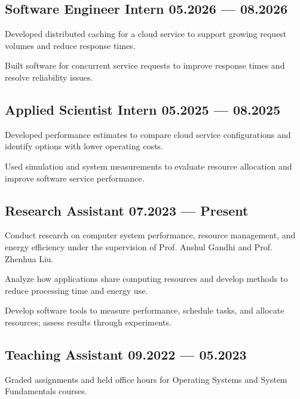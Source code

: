 \subsection{{Software Engineer Intern \hfill 05.2026 --- 08.2026}}
\begin{zitemize}
    \item Developed distributed caching for a cloud service to support growing request volumes and reduce response times.
    \item Built software for concurrent service requests to improve response times and resolve reliability issues.
\end{zitemize}

\subsection{{Applied Scientist Intern \hfill 05.2025 --- 08.2025}}
\begin{zitemize}
    \item Developed performance estimates to compare cloud service configurations and identify options with lower operating costs.
    \item Used simulation and system measurements to evaluate resource allocation and improve software service performance.
\end{zitemize}

\subsection{{Research Assistant \hfill 07.2023 --- Present}}
\begin{zitemize}
    \item Conduct research on computer system performance, resource management, and energy efficiency under the supervision of Prof. Anshul Gandhi and Prof. Zhenhua Liu.
    \item Analyze how applications share computing resources and develop methods to reduce processing time and energy use.
    \item Develop software tools to measure performance, schedule tasks, and allocate resources; assess results through experiments.
\end{zitemize}

\subsection{{Teaching Assistant \hfill 09.2022 --- 05.2023}}
\begin{zitemize}
    \item Graded assignments and held office hours for Operating Systems and System Fundamentals courses.
\end{zitemize}

